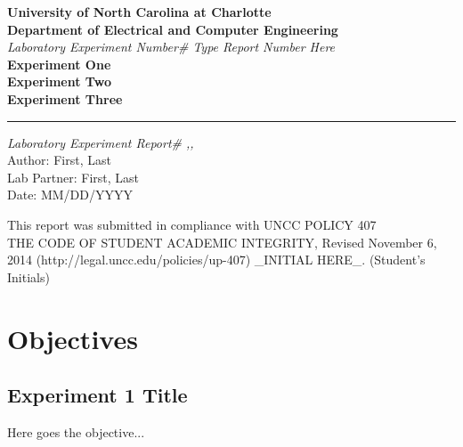 \documentclass[a4paper]{article}
\begin{document}
\begin{titlepage}
\thispagestyle{fancy} %
\rhead{}
\chead{}
\rfoot{}
\cfoot{}
\lfoot{}
\renewcommand{\headrulewidth}{0pt} %
    \begin{center}
        \vspace*{1cm}
        
      
       \Large\textbf{University of North Carolina at Charlotte \\[1pt]
	Department of Electrical and Computer Engineering} \\[2pt]
\textit{Laboratory Experiment Number\# Type Report Number Here} \\[5pt]
\textbf{Experiment One \\[5pt]
Experiment Two\\[5pt]
Experiment Three\\
}

\noindent\rule{15cm}{0.4pt}
\vfill
        \vspace{1.5cm}
        \textit{Laboratory Experiment Report\# ,,} \\
		Author: First, Last\\	 %
		Lab Partner: First, Last	\\ %
		Date: MM/DD/YYYY \\
        
        \vspace{1cm}
        
        
        
        \vfill
		\vfill
		\vfill
		\vfill
        
       \large This report was submitted in compliance with UNCC POLICY 407\\
THE CODE OF STUDENT ACADEMIC INTEGRITY, Revised November 6, 2014
(http://legal.uncc.edu/policies/up-407) \_INITIAL HERE\_. (Student’s Initials) 
        \vspace{0.8cm}
        
    

    \end{center}
\end{titlepage}


\section{Objectives}

\subsection{Experiment 1 Title}
Here goes the objective...
\end{document}
